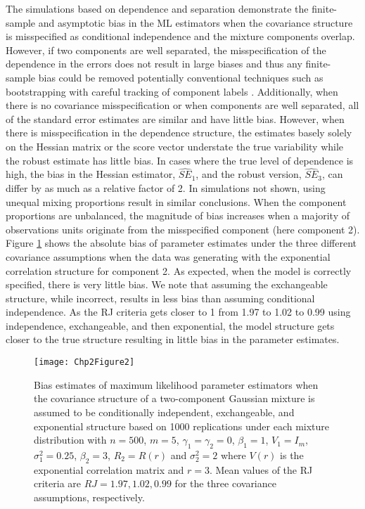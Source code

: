 The simulations based on dependence and separation demonstrate the finite-sample and asymptotic bias in the ML estimators when the covariance structure is misspecified as conditional independence and the mixture components overlap. However, if two components are well separated, the misspecification of the dependence in the errors does not result in large biases and thus any finite-sample bias could be removed potentially conventional techniques such as bootstrapping with careful tracking of component labels \cite{grun2004}. Additionally, when there is no covariance misspecification or when components are well separated, all of the standard error estimates are similar and have little bias. However, when there is misspecification in the dependence structure, the estimates basely solely on the Hessian matrix or the score vector understate the true variability while the robust estimate has little bias. In cases where the true level of dependence is high, the bias in the Hessian estimator, $\widehat{SE}_{1}$, and the robust version, $\widehat{SE}_{3}$, can differ by as much as a relative factor of 2. In simulations not shown, using unequal mixing proportions result in similar conclusions. When the component proportions are unbalanced, the magnitude of bias increases when a majority of observations units originate from the misspecified component (here component 2). \\

Figure \ref{fig:2-2} shows the absolute bias of parameter estimates under the three different covariance assumptions when the data was generating with the exponential correlation structure for component 2. As expected, when the model is correctly specified, there is very little bias. We note that assuming the exchangeable structure, while incorrect, results in less bias than assuming conditional independence. As the RJ criteria gets closer to 1 from 1.97 to 1.02 to 0.99 using independence, exchangeable, and then exponential, the model structure gets closer to the true structure resulting in little bias in the parameter estimates.
\begin{figure}
\begin{center}
\texttt{[image: Chp2Figure2]}
\end{center}
\caption{Bias estimates of maximum likelihood parameter estimators when the covariance structure of a two-component Gaussian mixture is assumed to be conditionally independent, exchangeable, and exponential structure based on 1000 replications under each mixture distribution with $n=500$, $m=5$, $\gamma_1=\gamma_2=0$, $\beta_{1}=1$, $V_1=I_{m}$, $\sigma_1^{2}=0.25$, $\beta_2=3$, $R_2=R(r)$ and $\sigma_2^{2}=2$ where $V(r)$ is the exponential correlation matrix and $r=3$. Mean values of the RJ criteria are $RJ = 1.97, 1.02, 0.99$ for the three covariance assumptions, respectively.}
\label{fig:2-2}
\end{figure}

